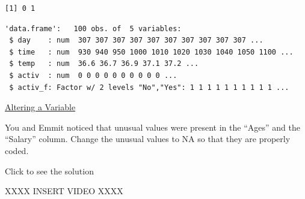 \documentclass[
  letterpaper,
  DIV=11,
  numbers=noendperiod]{scrreprt}
\newenvironment{Shaded}{\begin{snugshade}}{\end{snugshade}}
\newcommand{\FunctionTok}[1]{\textcolor[rgb]{0.28,0.35,0.67}{#1}}
\newcommand{\NormalTok}[1]{\textcolor[rgb]{0.00,0.23,0.31}{#1}}
\newcommand{\OtherTok}[1]{\textcolor[rgb]{0.00,0.23,0.31}{#1}}
\newcommand{\SpecialCharTok}[1]{\textcolor[rgb]{0.37,0.37,0.37}{#1}}
\newcommand{\StringTok}[1]{\textcolor[rgb]{0.13,0.47,0.30}{#1}}
\begin{document}
\begin{Shaded}
\end{Shaded}

\begin{verbatim}
[1] 0 1
\end{verbatim}

\begin{Shaded}
\end{Shaded}

\begin{verbatim}
'data.frame':   100 obs. of  5 variables:
 $ day    : num  307 307 307 307 307 307 307 307 307 307 ...
 $ time   : num  930 940 950 1000 1010 1020 1030 1040 1050 1100 ...
 $ temp   : num  36.6 36.7 36.9 37.1 37.2 ...
 $ activ  : num  0 0 0 0 0 0 0 0 0 0 ...
 $ activ_f: Factor w/ 2 levels "No","Yes": 1 1 1 1 1 1 1 1 1 1 ...
\end{verbatim}

\begin{watch}{}{}
    \href{https://youtu.be/fAcw4RpMgzU}{Altering a Variable}
\end{watch}

\begin{tcolorbox}[enhanced jigsaw, colframe=quarto-callout-tip-color-frame, colback=white, breakable, rightrule=.15mm, title=\textcolor{quarto-callout-tip-color}{\faLightbulb}\hspace{0.5em}{Try it Out}, bottomtitle=1mm, toptitle=1mm, titlerule=0mm, left=2mm, coltitle=black, colbacktitle=quarto-callout-tip-color!10!white, leftrule=.75mm, opacitybacktitle=0.6, bottomrule=.15mm, opacityback=0, arc=.35mm, toprule=.15mm]

You and Emmit noticed that unusual values were present in the ``Ages''
and the ``Salary'' column. Change the unusual values to NA so that they
are properly coded.

Click to see the solution

XXXX INSERT VIDEO XXXX

\end{tcolorbox}
\end{document}
